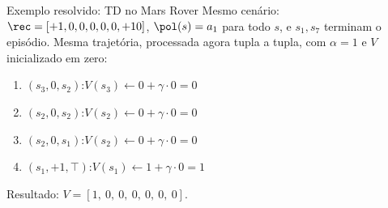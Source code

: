 \documentclass[aspectratio=169, 11pt]{beamer}
\begin{document}
\begin{frame}{Exemplo resolvido: TD no Mars Rover}
  Mesmo cenário: $\rec = [+1, 0, 0, 0, 0, 0, +10]$,
  $\pol(s) = a_1$ para todo $s$, e $s_1, s_7$ terminam o episódio.
  Mesma trajetória, processada agora tupla a tupla, com $\alpha = 1$
  e $V$ inicializado em zero:

  \medskip
  \centering

  \medskip
  \raggedright
  \begin{enumerate}\setlength{\itemsep}{0.2ex}
    \item $(s_3, 0, s_2)$:\quad $V(s_3) \leftarrow 0 + \gamma\cdot 0 = 0$
    \item $(s_2, 0, s_2)$:\quad $V(s_2) \leftarrow 0 + \gamma\cdot 0 = 0$
    \item $(s_2, 0, s_1)$:\quad $V(s_2) \leftarrow 0 + \gamma\cdot 0 = 0$
    \item $(s_1, +1, \top)$:\quad $V(s_1) \leftarrow 1 + \gamma\cdot 0 = 1$
  \end{enumerate}

  Resultado: $V = [1,\ 0,\ 0,\ 0,\ 0,\ 0,\ 0]$.
\end{frame}
\end{document}
